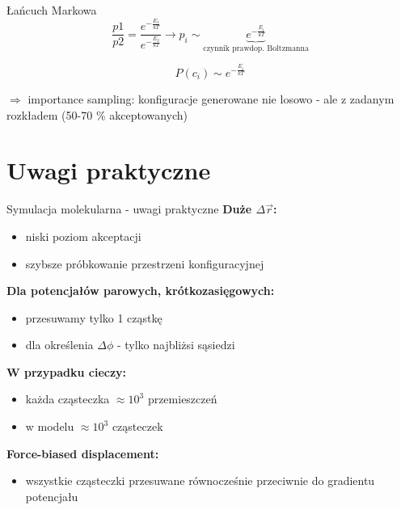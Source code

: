 	\begin{frame}{Łańcuch Markowa}
		$$
	 	\frac{p1}{p2} = \dfrac{e^{-\frac{E_1}{kT}}}{e^{-\frac{E_2}{kT}}} \rightarrow p_i \sim \underbrace{e^{-\frac{E_i}{kT}}}_{\text{czynnik prawdop. Boltzmanna}}
		$$		
		
		$$
		P(c_i) \sim e^{-\frac{E_i}{kT}}
		$$
		
		$\Rightarrow$ importance sampling: konfiguracje generowane nie losowo - ale z zadanym rozkładem (50-70 \% akceptowanych)
		
		
	\end{frame}
	
\section{Uwagi praktyczne}
\begin{frame}{Symulacja molekularna - uwagi praktyczne}
		\textbf{Duże $\Delta\vec{r}$:}
		\begin{itemize}
			\item niski poziom akceptacji
			\item szybsze próbkowanie przestrzeni konfiguracyjnej
		\end{itemize}
		
		\textbf{Dla potencjałów parowych, krótkozasięgowych:}
		\begin{itemize}
			\item przesuwamy tylko 1 cząstkę
			\item dla określenia $\Delta\phi$ - tylko najbliżsi sąsiedzi
		\end{itemize}
		
		\textbf{W przypadku cieczy:}
		\begin{itemize}
			\item każda cząsteczka $\approx 10^3$ przemieszczeń
			\item w modelu $\approx 10^3$ cząsteczek
		\end{itemize}	
		
		\textbf{Force-biased displacement:}
		\begin{itemize}
			\item wszystkie cząsteczki przesuwane równocześnie przeciwnie do gradientu potencjału
		\end{itemize}
		
	\end{frame}
